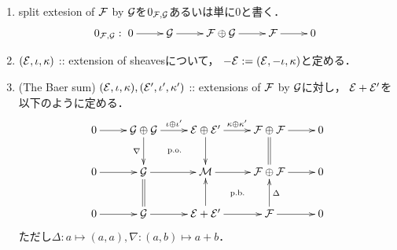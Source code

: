 \documentclass[a4paper]{jsarticle}
\makeatletter
\newcommand{\centerpb}{\ar@{}[lu]|{\text{p.b.}}}
\newcommand{\centerpo}{\ar@{}[lu]|{\text{p.o.}}}
\newcommand{\diag}{\Delta}
\newcommand{\codiag}{\nabla}
\makeatother
\begin{document}
    \begin{Def}
        \begin{enumerate}[label=(\arabic*), leftmargin=*]
        \item
            split extesion of $\mathcal{F}$ by $\mathcal{G}$を$0_{\mathcal{F}, \mathcal{G}}$あるいは単に$0$と書く．
            \[
            0_{\shF, \shG}:
                \xymatrix{
                    0 \ar[r]& \shG \ar[r]& \shF \oplus \shG \ar[r]& \shF \ar[r]& 0
            }\]
            
        \item
            $(\mathcal{E}, \iota, \kappa)$ :: extension of sheavesについて，
            $-\mathcal{E}:=(\mathcal{E}, -\iota, \kappa)$と定める．

        \item
            (The Baer sum)
            $(\mathcal{E}, \iota, \kappa), (\mathcal{E}', \iota', \kappa')$
            :: extensions of $\mathcal{F}$ by $\mathcal{G}$に対し，
            $\mathcal{E}+\mathcal{E}'$を以下のように定める．
            \[\vcenter{\xymatrix{
                0 \ar[r]& \shG \oplus \shG \ar[r]^-{\iota \oplus \iota'}\ar[d]_-{\codiag}& \shE \oplus \shE' \ar[r]^-{\kappa \oplus \kappa'}\ar[d]& \shF \oplus \shF \ar[r]\ar@{=}[d]& 0\\
                0 \ar[r]& \shG \ar[r]& \shM \ar[r]\centerpo& \shF \oplus \shF\ar[r]& 0\\
                0 \ar[r]& \shG \ar[r]\ar@{=}[u]& \shE+\shE' \ar[r]\ar[u]& \shF \ar[r]\ar[u]_-{\diag}\centerpb& 0 \\
            }}\]
            ただし$\diag: a \mapsto (a,a), \codiag: (a,b) \mapsto a+b$．
    \end{enumerate}
    \end{Def}
    
\end{document}
